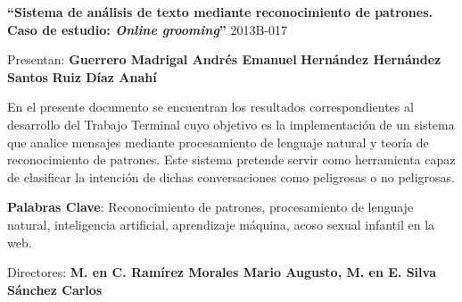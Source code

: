 \begin{titlepage}
\begin{center}
\large \textbf{``Sistema de an\'alisis de texto mediante reconocimiento de patrones. Caso de estudio: \textit{Online grooming}''} \linebreak
\large 2013B-017

\end{center}

\vspace{1.5cm}

\begin{center}
Presentan: \linebreak
\textbf{Guerrero Madrigal Andr\'es Emanuel} \linebreak
\textbf{Hern\'andez Hern\'andez Santos} \linebreak
\textbf{Ruiz D\'iaz Anah\'i} \linebreak
\end{center}

\vspace{1.5cm}


En el presente documento se encuentran los resultados correspondientes al desarrollo del Trabajo Terminal cuyo objetivo es la implementaci\'on de un sistema que analice mensajes mediante  procesamiento de lenguaje natural y teoría de reconocimiento de patrones. Este sistema pretende servir como herramienta capaz de clasificar la intención de dichas  conversaciones como peligrosas o no peligrosas. \linebreak

\textbf{Palabras Clave}:  Reconocimiento de patrones,  procesamiento de lenguaje natural, inteligencia artificial, aprendizaje máquina, acoso sexual infantil en la web.

\vspace{1.5cm}
 
\begin{center}


Directores: \linebreak
\textbf{ M. en C. Ram\'irez Morales Mario Augusto, M. en E.  Silva S\'anchez Carlos}

\end{center}





\end{titlepage}
